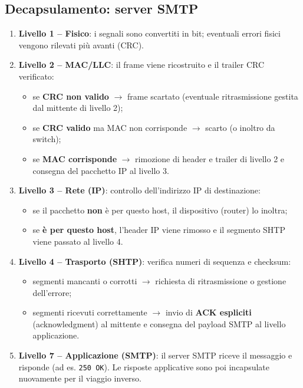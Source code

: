 \documentclass[a4paper,12pt]{report}
\begin{document}
\subsection*{Decapsulamento: server SMTP }
\begin{enumerate}
\item \textbf{Livello 1 -- Fisico}: i segnali sono convertiti in bit; eventuali errori fisici vengono rilevati più avanti (CRC).
\item \textbf{Livello 2 -- MAC/LLC}: il frame viene ricostruito e il trailer CRC verificato:
\begin{itemize}
\item se \textbf{CRC non valido} $\rightarrow$ frame scartato (eventuale ritrasmissione gestita dal mittente di livello 2);
\item se \textbf{CRC valido} ma MAC non corrisponde $\rightarrow$ scarto (o inoltro da switch);
\item se \textbf{MAC corrisponde} $\rightarrow$ rimozione di header e trailer di livello 2 e consegna del pacchetto IP al livello 3.
\end{itemize}
\item \textbf{Livello 3 -- Rete (IP)}: controllo dell’indirizzo IP di destinazione:
\begin{itemize}
\item se il pacchetto \textbf{non} è per questo host, il dispositivo (router) lo inoltra;
\item se \textbf{è per questo host}, l’header IP viene rimosso e il segmento SHTP viene passato al livello 4.
\end{itemize}
\item \textbf{Livello 4 -- Trasporto (SHTP)}: verifica numeri di sequenza e checksum:
\begin{itemize}
\item segmenti mancanti o corrotti $\rightarrow$ richiesta di ritrasmissione o gestione dell’errore;
\item segmenti ricevuti correttamente $\rightarrow$ invio di \textbf{ACK espliciti} (acknowledgment) al mittente e consegna del payload SMTP al livello applicazione.
\end{itemize}
\item \textbf{Livello 7 -- Applicazione (SMTP)}: il server SMTP riceve il messaggio e risponde (ad es. \texttt{250 OK}). Le risposte applicative sono poi incapsulate nuovamente per il viaggio inverso.
\end{enumerate}
\end{document}
